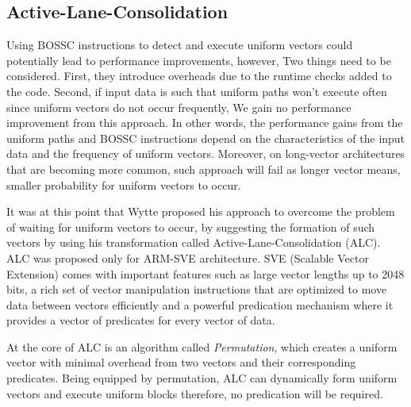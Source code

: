 \subsection{Active-Lane-Consolidation}
Using BOSSC instructions to detect and execute uniform vectors could potentially lead to performance improvements, however, Two things need to be considered. First,
they introduce overheads due to the runtime checks added to the code. Second, if input data is such that uniform paths won't execute often since uniform vectors do not occur frequently, We gain no performance improvement from this approach. In other words,  the performance gains from the uniform paths and BOSSC instructions depend on the characteristics of the input data and the frequency of uniform vectors. Moreover, on  long-vector architectures that are becoming more common, such approach will fail as longer vector means, smaller probability for uniform vectors to occur.

It was at this point that Wytte \cite{praharenka_vectorizing_2022} proposed his approach to overcome the problem of waiting for uniform vectors to occur, by suggesting the formation of such vectors by using his transformation called Active-Lane-Consolidation (ALC). ALC was proposed only for ARM-SVE architecture. SVE (Scalable Vector Extension) comes with important features such as large vector lengths up to 2048 bits, a rich set of vector manipulation instructions that are optimized to move data between vectors efficiently and a powerful predication mechanism where it provides a vector of predicates for every vector of data.

At the core of ALC is an algorithm called  \emph{Permutation}, which creates a uniform vector with minimal overhead from two vectors and their corresponding predicates. Being equipped by permutation, ALC can dynamically form uniform vectors and execute uniform blocks therefore, no predication will be required.

